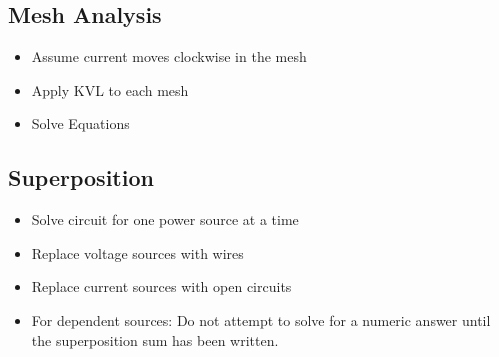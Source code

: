 \documentclass{article}
\begin{document}
\subsection*{Mesh Analysis}
\begin{itemize}
\item Assume current moves clockwise in the mesh
\item Apply KVL to each mesh
\item Solve Equations
\end{itemize}
\subsection*{Superposition}
\begin{itemize}
\item Solve circuit for one power source at a time
\item Replace voltage sources with wires
\item Replace current sources with open circuits
\item For dependent sources: Do not attempt to solve for a numeric answer until the superposition sum has been written.
\end{itemize}
\end{document}
